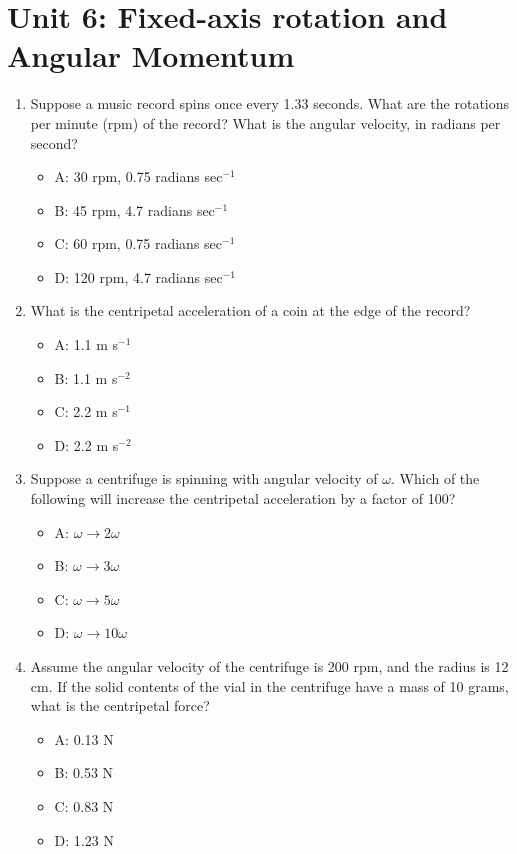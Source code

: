 \documentclass[10pt]{article}
\begin{document}
\section{Unit 6: Fixed-axis rotation and Angular Momentum}

\begin{enumerate}
\item Suppose a music record spins once every 1.33 seconds.  What are the rotations per minute (rpm) of the record?  What is the angular velocity, in radians per second?
\begin{itemize}
\item A: 30 rpm, 0.75 radians sec$^{-1}$
\item B: 45 rpm, 4.7 radians sec$^{-1}$
\item C: 60 rpm, 0.75 radians sec$^{-1}$
\item D: 120 rpm, 4.7 radians sec$^{-1}$
\end{itemize}
\item What is the centripetal acceleration of a coin at the edge of the record?
\begin{itemize}
\item A: 1.1 m s$^{-1}$
\item B: 1.1 m s$^{-2}$
\item C: 2.2 m s$^{-1}$
\item D: 2.2 m s$^{-2}$
\end{itemize}
\item Suppose a centrifuge is spinning with angular velocity of $\omega$.  Which of the following will increase the centripetal acceleration by a factor of 100?
\begin{itemize}
\item A: $\omega \rightarrow 2\omega$
\item B: $\omega \rightarrow 3\omega$
\item C: $\omega \rightarrow 5\omega$
\item D: $\omega \rightarrow 10\omega$
\end{itemize}
\item Assume the angular velocity of the centrifuge is 200 rpm, and the radius is 12 cm.  If the solid contents of the vial in the centrifuge have a mass of 10 grams, what is the centripetal force?
\begin{itemize}
\item A: 0.13 N
\item B: 0.53 N
\item C: 0.83 N
\item D: 1.23 N
\end{itemize}

\end{enumerate}
\end{document}
